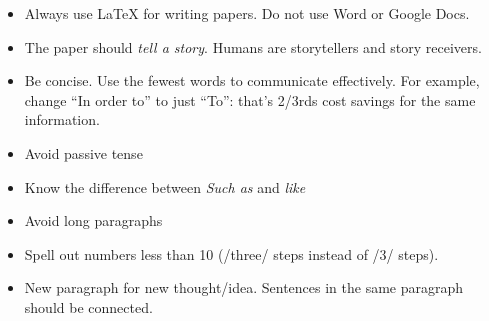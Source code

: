 \documentclass[oneside,11pt]{book}
\newcommand{\code}{\texttt}
\begin{document}
\begin{itemize}
\item Always use LaTeX for writing papers. Do not use Word or Google Docs.
\item The paper should \emph{tell a story}. Humans are storytellers and story receivers.
  \item Be concise. Use the fewest words to communicate effectively.  For example, change ``In order to'' to just ``To'': that's 2/3rds cost savings for the same information.
   \item Avoid passive tense
   \item Know the difference between \emph{Such as} and \emph{like}
   \item Avoid long paragraphs
   \item Spell out numbers less than 10 (/three/ steps instead of /3/ steps).
   \item New paragraph for new thought/idea. Sentences in the same paragraph should be connected.


\end{itemize}


\end{document}
